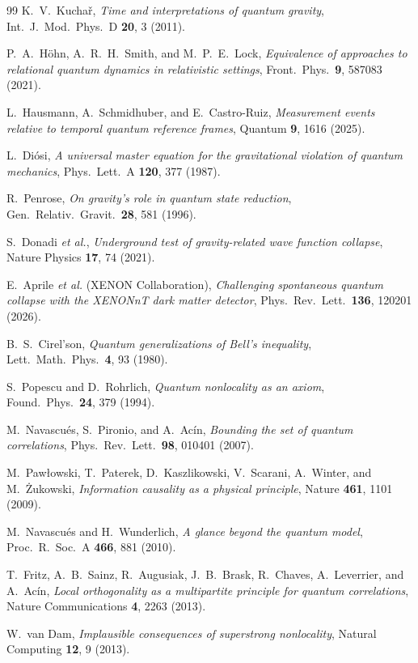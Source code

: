 \documentclass[11pt,a4paper]{article}
\theoremstyle{definition}
\theoremstyle{plain}
\theoremstyle{remark}
\begin{document}
\begin{thebibliography}{99}
 K.~V.~Kucha\v{r}, \emph{Time and interpretations of
quantum gravity}, Int.\ J.\ Mod.\ Phys.\ D \textbf{20}, 3 (2011).

 P.~A.~H\"ohn, A.~R.~H.~Smith, and M.~P.~E.~Lock,
\emph{Equivalence of approaches to relational quantum dynamics in
relativistic settings}, Front.\ Phys.\ \textbf{9}, 587083 (2021).

 L.~Hausmann, A.~Schmidhuber, and E.~Castro-Ruiz,
\emph{Measurement events relative to temporal quantum reference frames},
Quantum \textbf{9}, 1616 (2025).

 L.~Di\'osi, \emph{A universal master equation for the
gravitational violation of quantum mechanics}, Phys.\ Lett.\ A
\textbf{120}, 377 (1987).

 R.~Penrose, \emph{On gravity's role in quantum state
reduction}, Gen.\ Relativ.\ Gravit.\ \textbf{28}, 581 (1996).

 S.~Donadi \emph{et al.}, \emph{Underground test of
gravity-related wave function collapse}, Nature Physics \textbf{17}, 74
(2021).

 E.~Aprile \emph{et al.} (XENON Collaboration),
\emph{Challenging spontaneous quantum collapse with the XENONnT dark
matter detector}, Phys.\ Rev.\ Lett.\ \textbf{136}, 120201 (2026).

 B.~S.~Cirel'son, \emph{Quantum generalizations of
Bell's inequality}, Lett.\ Math.\ Phys.\ \textbf{4}, 93 (1980).

 S.~Popescu and D.~Rohrlich, \emph{Quantum nonlocality as an
axiom}, Found.\ Phys.\ \textbf{24}, 379 (1994).

 M.~Navascu\'es, S.~Pironio, and A.~Ac\'in, \emph{Bounding
the set of quantum correlations}, Phys.\ Rev.\ Lett.\ \textbf{98},
010401 (2007).

 M.~Paw{\l}owski, T.~Paterek, D.~Kaszlikowski,
V.~Scarani, A.~Winter, and M.~\.Zukowski, \emph{Information causality as
a physical principle}, Nature \textbf{461}, 1101 (2009).

 M.~Navascu\'es and H.~Wunderlich, \emph{A glance
beyond the quantum model}, Proc.\ R.\ Soc.\ A \textbf{466}, 881 (2010).

 T.~Fritz, A.~B.~Sainz, R.~Augusiak, J.~B.~Brask,
R.~Chaves, A.~Leverrier, and A.~Ac\'in, \emph{Local orthogonality as a
multipartite principle for quantum correlations}, Nature Communications
\textbf{4}, 2263 (2013).

 W.~van Dam, \emph{Implausible consequences of
superstrong nonlocality}, Natural Computing \textbf{12}, 9 (2013).

\end{thebibliography}
\end{document}
